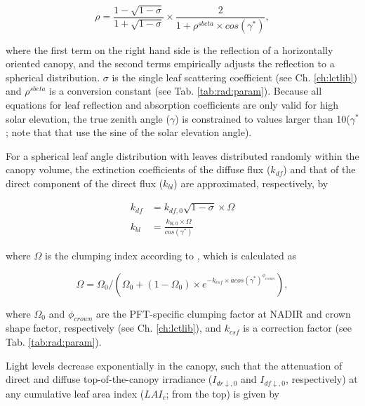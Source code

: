 \begin{equation}\label{eq:rad:leaf_albedo}
\rho = \frac{1-\sqrt{1-\sigma}}{1+\sqrt{1-\sigma}}\times \frac{2}{1+ \rho^{sbeta} \times cos(\gamma^{*})}, 
\end{equation}
  
where the first term on the right hand side is the reflection of a horizontally oriented canopy, and the second terms empirically adjusts the reflection to a spherical distribution. $\sigma$ is the single leaf scattering coefficient (see Ch. \ref{ch:lctlib}) and $\rho^{sbeta}$ is a conversion constant (see Tab. \ref{tab:rad:param}). Because all equations for leaf reflection and absorption coefficients are only valid for high solar elevation, the true zenith angle ($\gamma$) is constrained to values larger than 10\degree ($\gamma^{*}$; note that that \cite{Spitters:1986tv} use the sine of the solar elevation angle). 

For a spherical leaf angle distribution with leaves distributed randomly within the canopy volume, the extinction coefficients of the diffuse flux ($k_{df}$) and that of the direct component of the direct flux ($k_{bl}$) are approximated, respectively, by 

\begin{subequations}\label{eq:rad:extinction_coef}
\begin{align}
k_{df} &=  k_{df,0} \sqrt{1-\sigma} \times \Omega\\
k_{bl} &= \frac{k_{bl,0} \times \Omega}{cos(\gamma^{*})}
\end{align} 
\end{subequations} 

where $\Omega$ is the clumping index according to \cite{Campbell:1998vb}, which is calculated as 

\begin{equation}\label{eq:rad:omega}
\Omega = \Omega_{0} / (\Omega_{0} + (1 - \Omega_{0}) \times e^{-k_{csf} \times acos(\gamma^{*})^{\phi_{crown}}}),
\end{equation}

where $\Omega_{0}$ and $\phi_{crown}$ are the PFT-specific clumping factor at NADIR and crown shape factor, respectively (see Ch. \ref{ch:lctlib}), and $k_{csf}$ is a correction factor (see Tab. \ref{tab:rad:param}).

Light levels decrease exponentially in the canopy, such that the attenuation of direct and diffuse top-of-the-canopy irradiance ($I_{dr\downarrow,0}$ and $I_{df\downarrow,0}$, respectively) at any cumulative leaf area index ($LAI_c$; from the top) is given by 

